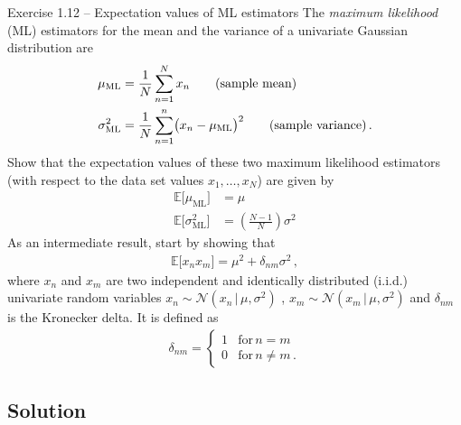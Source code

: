 \documentclass[11pt, DINA4, fleqn]{amsart}
\begin{document}
\begin{mybox_tc3}{Exercise 1.12 -- Expectation values of ML estimators}
The \emph{maximum likelihood} (ML) estimators for the mean and the variance of a univariate Gaussian distribution are
\begin{align}
\mu_{\text{ML}} &= \dfrac{1}{N} \sum\displaylimits_{n = 1}^{N} x_n \qquad \text{(sample mean)} \\
\sigma^2_{\text{ML}} &= \dfrac{1}{N} \sum\displaylimits_{n = 1}^{n}\bigl(x_n - \mu_{\text{ML}}\bigl)^2 \qquad \text{(sample variance)} \, .
\end{align}
Show that the expectation values of these two maximum likelihood estimators (with respect to the data set values $x_1, \dots, x_N$) are given by
\begin{align}
\mathbb{E}\bigl[\mu_{\text{ML}}\bigl] &= \mu \\
\mathbb{E}\bigl[\sigma^2_{\text{ML}}\bigl] &= \left(\frac{N - 1}{N}\right) \sigma^2
\end{align}
As an intermediate result, start by showing that
\begin{align}
\mathbb{E}\bigl[x_n x_m\bigl] = \mu^2 + \delta_{nm} \sigma^2 \, ,
\label{eq:interResult}
\end{align}
where $x_n$ and $x_m$ are two independent and identically distributed (i.i.d.) univariate random variables $x_n \sim \mathcal{N}\left(x_n \,\bigl| \, \mu, \sigma^2\right)$ , $x_m\sim \mathcal{N}(x_m \, \bigl| \, \mu, \sigma^2)$ and $\delta_{nm}$ is the Kronecker delta.
It is defined as
\begin{align}
\delta_{nm} = \begin{cases}
1 & \text{for} \, n = m \\
0 & \text{for} \, n \neq m \, .
\end{cases}
\end{align}
\end{mybox_tc3}

\subsection*{Solution}
\end{document}
